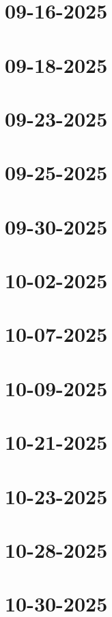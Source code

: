 \documentclass[]{mangos-musings}
\begin{document}
\newpage
\section{09-16-2025}

\newpage
\section{09-18-2025}

\newpage
\section{09-23-2025}

\newpage
\section{09-25-2025}

\newpage
\section{09-30-2025}

\newpage
\section{10-02-2025}

\newpage
\section{10-07-2025}

\newpage
\section{10-09-2025}

\newpage
\section{10-21-2025}

\newpage
\section{10-23-2025}

\newpage
\section{10-28-2025}

\newpage
\section{10-30-2025}
\end{document}
